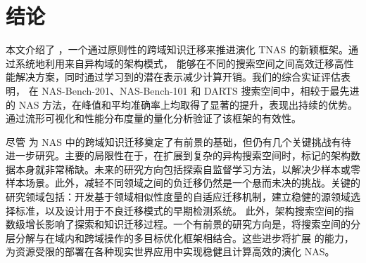 \documentclass[../main_zh.tex]{subfiles}
\begin{document}
\section{结论}\label{sec:conclusion}

\DiffBegin
本文介绍了 \OUR{}，一个通过原则性的跨域知识迁移来推进演化 TNAS 的新颖框架。通过系统地利用来自异构域的架构模式，\OUR{} 能够在不同的搜索空间之间高效迁移高性能解决方案，同时通过学习到的潜在表示减少计算开销。我们的综合实证评估表明，\OUR{} 在 NAS-Bench-201、NAS-Bench-101 和 DARTS 搜索空间中，相较于最先进的 NAS 方法，在峰值和平均准确率上均取得了显著的提升，表现出持续的优势。通过流形可视化和性能分布度量的量化分析验证了该框架的有效性。

尽管 \OUR{} 为 NAS 中的跨域知识迁移奠定了有前景的基础，但仍有几个关键挑战有待进一步研究。主要的局限性在于，在扩展到复杂的异构搜索空间时，标记的架构数据本身就非常稀缺。未来的研究方向包括探索自监督学习方法，以解决少样本或零样本场景。此外，减轻不同领域之间的负迁移仍然是一个悬而未决的挑战。关键的研究领域包括：开发基于领域相似性度量的自适应迁移机制，建立稳健的源领域选择标准，以及设计用于不良迁移模式的早期检测系统。
此外，架构搜索空间的指数级增长影响了探索和知识迁移过程。一个有前景的研究方向是，将搜索空间的分层分解与在域内和跨域操作的多目标优化框架相结合。这些进步将扩展 \OUR{} 的能力，为资源受限的部署在各种现实世界应用中实现稳健且计算高效的演化 NAS。
\DiffEnd
\end{document}
